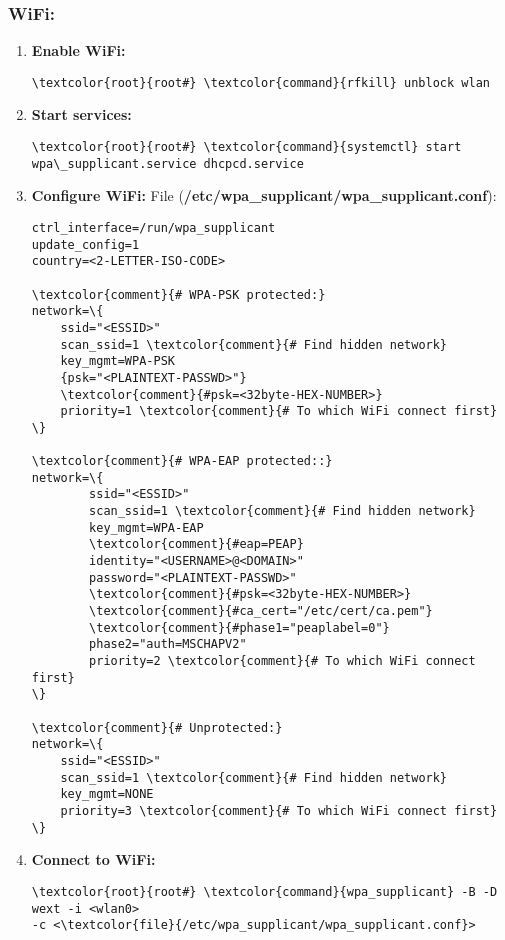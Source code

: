 \documentclass[10pt, a4paper, onecolumn, openany]{book} %
\begin{document}
\subsubsection{WiFi:}
\begin{enumerate}
    \item \textbf{Enable WiFi:}
\begin{Verbatim}[commandchars=\\\{\}]
\textcolor{root}{root#} \textcolor{command}{rfkill} unblock wlan
\end{Verbatim}
    \item \textbf{Start services:}
\begin{Verbatim}[commandchars=\\\{\}]
\textcolor{root}{root#} \textcolor{command}{systemctl} start wpa\_supplicant.service dhcpcd.service
\end{Verbatim}
    \item \textbf{Configure WiFi:}
\newline File (\textbf{\textcolor{file}{/etc/wpa\_supplicant/wpa\_supplicant.conf}}):
\begin{Verbatim}[commandchars=\\\{\}]
ctrl_interface=/run/wpa_supplicant
update_config=1
country=<2-LETTER-ISO-CODE>

\textcolor{comment}{# WPA-PSK protected:}
network=\{
    ssid="<ESSID>"
    scan_ssid=1 \textcolor{comment}{# Find hidden network}
    key_mgmt=WPA-PSK
    {psk="<PLAINTEXT-PASSWD>"}
    \textcolor{comment}{#psk=<32byte-HEX-NUMBER>}
    priority=1 \textcolor{comment}{# To which WiFi connect first}
\}

\textcolor{comment}{# WPA-EAP protected::}
network=\{
        ssid="<ESSID>"
        scan_ssid=1 \textcolor{comment}{# Find hidden network}
        key_mgmt=WPA-EAP
        \textcolor{comment}{#eap=PEAP}
        identity="<USERNAME>@<DOMAIN>"
        password="<PLAINTEXT-PASSWD>"
        \textcolor{comment}{#psk=<32byte-HEX-NUMBER>}
        \textcolor{comment}{#ca_cert="/etc/cert/ca.pem"}
        \textcolor{comment}{#phase1="peaplabel=0"}
        phase2="auth=MSCHAPV2"
        priority=2 \textcolor{comment}{# To which WiFi connect first}
\}

\textcolor{comment}{# Unprotected:}
network=\{
    ssid="<ESSID>"
    scan_ssid=1 \textcolor{comment}{# Find hidden network}
    key_mgmt=NONE
    priority=3 \textcolor{comment}{# To which WiFi connect first}
\}    
\end{Verbatim}

    \item \textbf{Connect to WiFi:}
\begin{Verbatim}[commandchars=\\\{\}]
\textcolor{root}{root#} \textcolor{command}{wpa_supplicant} -B -D wext -i <wlan0> 
-c <\textcolor{file}{/etc/wpa_supplicant/wpa_supplicant.conf}>
\end{Verbatim}
\end{enumerate}
\end{document}
